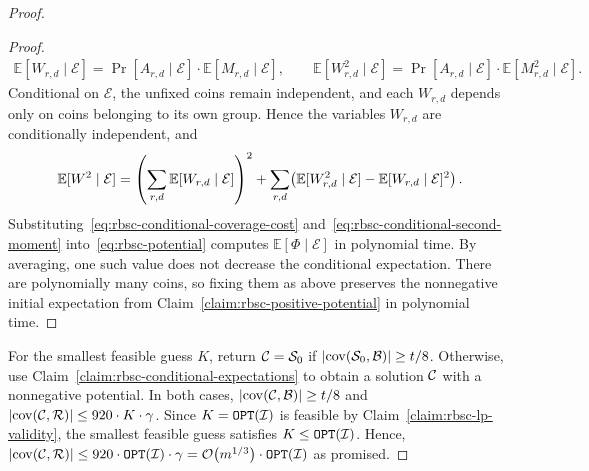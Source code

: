 \begin{proof}
\begin{proof}
\[\begin{gathered}
 \mathbb{E}[W_{r,d}\mid\mathcal{E}]=\Pr[A_{r,d}\mid\mathcal{E}]\cdot\mathbb{E}[M_{r,d}\mid\mathcal{E}],\qquad
 \mathbb{E}[W_{r,d}^2\mid\mathcal{E}]=\Pr[A_{r,d}\mid\mathcal{E}]\cdot\mathbb{E}[M_{r,d}^2\mid\mathcal{E}].
 \end{gathered}
\]
Conditional on $\mathcal{E}$, the unfixed coins remain independent, and each $W_{r,d}$ depends only on coins belonging to its own group. Hence the variables $W_{r,d}$ are conditionally independent, and
\begin{equation}\label{eq:rbsc-conditional-second-moment}
 \mathbb{E}[W^2\mid\mathcal{E}]
 =\mathopen{}\left( \sum_{r,d}\mathbb{E}[W_{r,d}\mid\mathcal{E}] \right)^2
  +\sum_{r,d}\mathopen{}\left( \mathbb{E}[W_{r,d}^2\mid\mathcal{E}]-\mathbb{E}[W_{r,d}\mid\mathcal{E}]^2 \right).
\end{equation}
Substituting~\eqref{eq:rbsc-conditional-coverage-cost} and~\eqref{eq:rbsc-conditional-second-moment} into~\eqref{eq:rbsc-potential} computes $\mathbb{E}[\Phi\mid\mathcal{E}]$ in polynomial time.
By averaging, one such value does not decrease the conditional expectation. There are polynomially many coins, so fixing them as above preserves the nonnegative initial expectation from Claim~\ref{claim:rbsc-positive-potential} in polynomial time.
\end{proof}

For the smallest feasible guess $K$, return $\mathcal{C}=\mathcal{S}_0$ if $\mathopen{}\left| \operatorname{cov}\mathopen{}\left( \mathcal{S}_0,\mathcal{B} \right) \right|\geq t/8$. Otherwise, use Claim~\ref{claim:rbsc-conditional-expectations} to obtain a solution $\mathcal{C}$ with a nonnegative potential. In both cases, $\mathopen{}\left| \operatorname{cov}\mathopen{}\left( \mathcal{C},\mathcal{B} \right) \right|\geq t/8$ and $\mathopen{}\left| \operatorname{cov}\mathopen{}\left( \mathcal{C},\mathcal{R} \right) \right|\leq920\cdot K\cdot \gamma$. Since $K=\texttt{OPT}\mathopen{}\left( \mathcal{I} \right)$ is feasible by Claim~\ref{claim:rbsc-lp-validity}, the smallest feasible guess satisfies $K\leq\texttt{OPT}\mathopen{}\left( \mathcal{I} \right)$. Hence, $\mathopen{}\left| \operatorname{cov}\mathopen{}\left( \mathcal{C},\mathcal{R} \right) \right|\leq920\cdot\texttt{OPT}\mathopen{}\left( \mathcal{I} \right)\cdot \gamma = \mathcal{O}\mathopen{}\left( m^{1/3} \right)\cdot \texttt{OPT}\mathopen{}\left( \mathcal{I} \right)$ as promised.
\end{proof}

